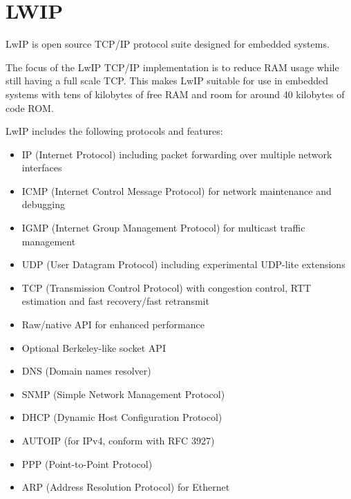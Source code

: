 \chapter{LWIP}
LwIP is open source TCP/IP protocol suite designed for embedded systems.

The focus of the LwIP TCP/IP implementation is to reduce RAM usage while still
having a full scale TCP. This makes LwIP
suitable for use in embedded systems with tens of kilobytes of free RAM and room
for around 40 kilobytes of code ROM.

LwIP includes the following protocols and features:\citep{lwip-16}

\begin{itemize}
	\item IP (Internet Protocol) including packet forwarding over multiple network interfaces
	\item ICMP (Internet Control Message Protocol) for network maintenance and debugging
	\item IGMP (Internet Group Management Protocol) for multicast traffic management
	\item UDP (User Datagram Protocol) including experimental UDP-lite extensions
	\item TCP (Transmission Control Protocol) with congestion control, RTT estimation and fast recovery/fast retransmit
	\item Raw/native API for enhanced performance
	\item Optional Berkeley-like socket API
	\item DNS (Domain names resolver)
	\item SNMP (Simple Network Management Protocol)
	\item DHCP (Dynamic Host Configuration Protocol)
	\item AUTOIP (for IPv4, conform with RFC 3927)
	\item PPP (Point-to-Point Protocol)
	\item ARP (Address Resolution Protocol) for Ethernet
\end{itemize}



